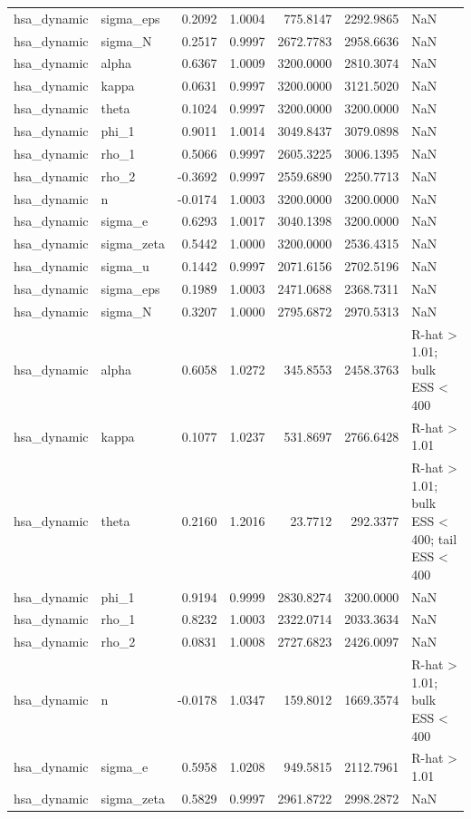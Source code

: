\begin{tabular}{llrrrrl}
hsa\_dynamic & sigma\_eps & 0.2092 & 1.0004 & 775.8147 & 2292.9865 & NaN \\
hsa\_dynamic & sigma\_N & 0.2517 & 0.9997 & 2672.7783 & 2958.6636 & NaN \\
hsa\_dynamic & alpha & 0.6367 & 1.0009 & 3200.0000 & 2810.3074 & NaN \\
hsa\_dynamic & kappa & 0.0631 & 0.9997 & 3200.0000 & 3121.5020 & NaN \\
hsa\_dynamic & theta & 0.1024 & 0.9997 & 3200.0000 & 3200.0000 & NaN \\
hsa\_dynamic & phi\_1 & 0.9011 & 1.0014 & 3049.8437 & 3079.0898 & NaN \\
hsa\_dynamic & rho\_1 & 0.5066 & 0.9997 & 2605.3225 & 3006.1395 & NaN \\
hsa\_dynamic & rho\_2 & -0.3692 & 0.9997 & 2559.6890 & 2250.7713 & NaN \\
hsa\_dynamic & n & -0.0174 & 1.0003 & 3200.0000 & 3200.0000 & NaN \\
hsa\_dynamic & sigma\_e & 0.6293 & 1.0017 & 3040.1398 & 3200.0000 & NaN \\
hsa\_dynamic & sigma\_zeta & 0.5442 & 1.0000 & 3200.0000 & 2536.4315 & NaN \\
hsa\_dynamic & sigma\_u & 0.1442 & 0.9997 & 2071.6156 & 2702.5196 & NaN \\
hsa\_dynamic & sigma\_eps & 0.1989 & 1.0003 & 2471.0688 & 2368.7311 & NaN \\
hsa\_dynamic & sigma\_N & 0.3207 & 1.0000 & 2795.6872 & 2970.5313 & NaN \\
hsa\_dynamic & alpha & 0.6058 & 1.0272 & 345.8553 & 2458.3763 & R-hat > 1.01; bulk ESS < 400 \\
hsa\_dynamic & kappa & 0.1077 & 1.0237 & 531.8697 & 2766.6428 & R-hat > 1.01 \\
hsa\_dynamic & theta & 0.2160 & 1.2016 & 23.7712 & 292.3377 & R-hat > 1.01; bulk ESS < 400; tail ESS < 400 \\
hsa\_dynamic & phi\_1 & 0.9194 & 0.9999 & 2830.8274 & 3200.0000 & NaN \\
hsa\_dynamic & rho\_1 & 0.8232 & 1.0003 & 2322.0714 & 2033.3634 & NaN \\
hsa\_dynamic & rho\_2 & 0.0831 & 1.0008 & 2727.6823 & 2426.0097 & NaN \\
hsa\_dynamic & n & -0.0178 & 1.0347 & 159.8012 & 1669.3574 & R-hat > 1.01; bulk ESS < 400 \\
hsa\_dynamic & sigma\_e & 0.5958 & 1.0208 & 949.5815 & 2112.7961 & R-hat > 1.01 \\
hsa\_dynamic & sigma\_zeta & 0.5829 & 0.9997 & 2961.8722 & 2998.2872 & NaN \\

\end{tabular}

